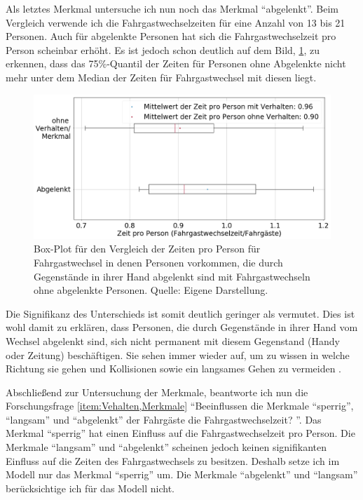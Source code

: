 Als letztes Merkmal untersuche ich nun noch das Merkmal "`abgelenkt"'. Beim Vergleich verwende ich die Fahrgastwechselzeiten für eine Anzahl von 13 bis 21 Personen. Auch für abgelenkte Personen hat sich die Fahrgastwechselzeit pro Person scheinbar erhöht. Es ist jedoch schon deutlich auf dem Bild, \figurename \ref{fig:BoxPlotAbgelenkt}, zu erkennen, dass das 75\%-Quantil der Zeiten für Personen ohne Abgelenkte nicht mehr unter dem Median der Zeiten für Fahrgastwechsel mit diesen liegt.
\begin{figure}[H]
	\centering
		\includegraphics[height=0.3\textwidth]{pictures/data_evaluation/behavior/comp_Abgelenkt.png}
	\caption{Box-Plot für den Vergleich der Zeiten pro Person für Fahrgastwechsel in denen Personen vorkommen, die durch Gegenstände in ihrer Hand abgelenkt sind mit Fahrgastwechseln ohne abgelenkte Personen. Quelle: Eigene Darstellung.}
	\label{fig:BoxPlotAbgelenkt}
\end{figure}
Die Signifikanz des Unterschieds ist somit deutlich geringer als vermutet. Dies ist wohl damit zu erklären, dass Personen, die durch Gegenstände in ihrer Hand vom Wechsel abgelenkt sind, sich nicht permanent mit diesem Gegenstand (\zB Handy oder Zeitung) beschäftigen. Sie sehen immer wieder auf, um zu wissen in welche Richtung sie gehen und Kollisionen sowie ein langsames Gehen zu vermeiden .

Abschließend zur Untersuchung der Merkmale, beantworte ich nun die Forschungsfrage \ref{item:Vehalten,Merkmale} "`Beeinflussen die Merkmale "`sperrig"', "`langsam"' und "`abgelenkt"' der Fahrgäste die Fahrgastwechselzeit? "'. Das Merkmal "`sperrig"' hat einen Einfluss auf die Fahrgastwechselzeit pro Person. Die Merkmale "`langsam"' und "`abgelenkt"' scheinen jedoch keinen signifikanten Einfluss auf die Zeiten des Fahrgastwechsels zu besitzen. Deshalb setze ich im Modell nur das Merkmal "`sperrig"' um. Die Merkmale "`abgelenkt"' und "`langsam"' berücksichtige ich für das Modell nicht. 

